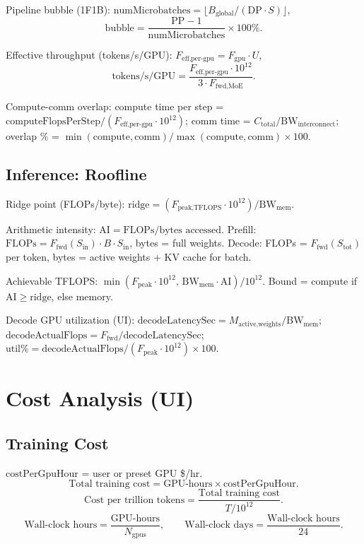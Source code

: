 \documentclass[11pt]{article}
\begin{document}
Pipeline bubble (1F1B): $\mathrm{numMicrobatches} = \lfloor B_{\text{global}} / (\mathrm{DP} \cdot S) \rfloor$,
\[
\text{bubble} = \frac{\mathrm{PP} - 1}{\mathrm{numMicrobatches}} \times 100\%.
\]

Effective throughput (tokens/s/GPU): $F_{\text{eff,per-gpu}} = F_{\text{gpu}} \cdot U$,
\[
\text{tokens/s/GPU} = \frac{F_{\text{eff,per-gpu}} \cdot 10^{12}}{3 \cdot F_{\text{fwd,MoE}}}.
\]

Compute-comm overlap: compute time per step = $\text{computeFlopsPerStep} / (F_{\text{eff,per-gpu}} \cdot 10^{12})$; comm time = $C_{\text{total}} / \mathrm{BW}_{\text{interconnect}}$; overlap \% = $\min(\text{compute}, \text{comm}) / \max(\text{compute}, \text{comm}) \times 100$.

\subsection{Inference: Roofline}

Ridge point (FLOPs/byte): $\text{ridge} = (F_{\text{peak,TFLOPS}} \cdot 10^{12}) / \mathrm{BW}_{\text{mem}}$.

Arithmetic intensity: $\mathrm{AI} = \text{FLOPs} / \text{bytes accessed}$. Prefill: $\text{FLOPs} = F_{\text{fwd}}(S_{\text{in}}) \cdot B \cdot S_{\text{in}}$, bytes = full weights. Decode: FLOPs = $F_{\text{fwd}}(S_{\text{tot}})$ per token, bytes = active weights + KV cache for batch.

Achievable TFLOPS: $\min(F_{\text{peak}} \cdot 10^{12},\, \mathrm{BW}_{\text{mem}} \cdot \mathrm{AI}) / 10^{12}$. Bound = compute if $\mathrm{AI} \ge \text{ridge}$, else memory.

Decode GPU utilization (UI): $\text{decodeLatencySec} = M_{\text{active,weights}} / \mathrm{BW}_{\text{mem}}$; $\text{decodeActualFlops} = F_{\text{fwd}} / \text{decodeLatencySec}$; $\text{util\%} = \text{decodeActualFlops} / (F_{\text{peak}} \cdot 10^{12}) \times 100$.

\section{Cost Analysis (UI)}

\subsection{Training Cost}
$\mathrm{costPerGpuHour}$ = user or preset GPU \$/hr.
\[
\text{Total training cost} = \text{GPU-hours} \times \mathrm{costPerGpuHour}.
\]
\[
\text{Cost per trillion tokens} = \frac{\text{Total training cost}}{T/10^{12}}.
\]
\[
\text{Wall-clock hours} = \frac{\text{GPU-hours}}{N_{\mathrm{gpus}}}, \qquad \text{Wall-clock days} = \frac{\text{Wall-clock hours}}{24}.
\]
\end{document}
